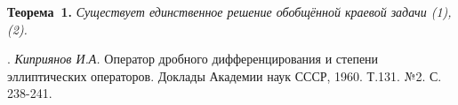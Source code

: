 \textbf{Теорема~1.} {\it Существует единственное    решение обобщённой  краевой задачи (1),(2).}



. {\it Киприянов И.А.} Оператор дробного дифференцирования и  степени эллиптических операторов. Доклады Академии наук СССР, 1960. Т.131. №2. С. 238-241.
